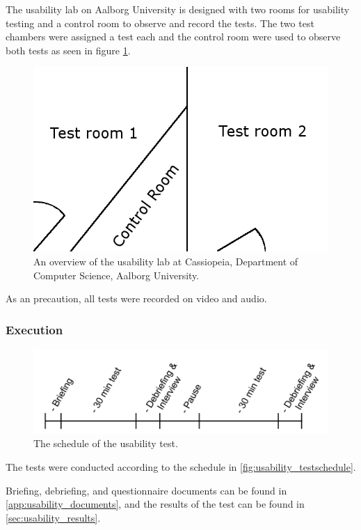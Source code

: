 The usability lab on Aalborg University is designed with two rooms for usability testing and a control room to observe and record the tests.
The two test chambers were assigned a test each and the control room were used to observe both tests as seen in figure \ref{fig:test_setup}.

\begin{figure}[H]
	\centering
		\includegraphics[width=\textwidth]{images/test_setup.png}
	\caption{An overview of the usability lab at Cassiopeia, Department of Computer Science, Aalborg University.}
	\label{fig:test_setup}
\end{figure}

As an precaution, all tests were recorded on video and audio.

\subsubsection*{Execution}

\begin{figure}[H]
	\centering
		\includegraphics[width=\textwidth]{images/usability_testschedule.png}
	\caption{The schedule of the usability test.}
	\label{fig:usability_testschedule}
\end{figure}

The tests were conducted according to the schedule in \autoref{fig:usability_testschedule}.

Briefing, debriefing, and questionnaire documents can be found in \autoref{app:usability_documents}, and the results of the test can be found in \autoref{sec:usability_results}.